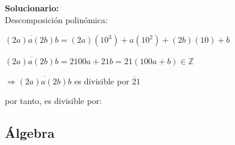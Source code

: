 \begin{enumerate}
	\vspace{2mm}
	\textbf{Solucionario:}\\
	
	Descomposición polinómica:
	
	$\overline{(2a)a(2b)b}=(2a)(10^3)+a(10^2)+(2b)(10)+b$
	
	$\overline{(2a)a(2b)b}=2100a+21b=21(100a+b)\in \mathbb{Z}$
	
	$\Rightarrow \overline{(2a)a(2b)b}$ es divisible por $\mathring{21}$
	
	por tanto, es divisible por:
	
	
	\vspace{6mm}
	
\end{enumerate}





\subsection*{Álgebra}

